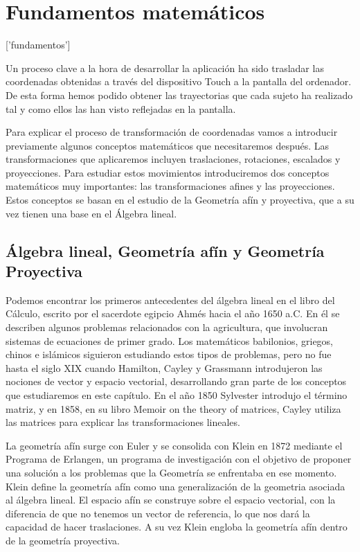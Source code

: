 \documentclass[a4paper,11pt, oneside]{book}
\begin{document}
\chapter{Fundamentos matemáticos}['fundamentos']

Un proceso clave a la hora de desarrollar la aplicación ha sido trasladar las coordenadas obtenidas a través del dispositivo Touch a la pantalla del ordenador. De esta forma hemos podido obtener las trayectorias que cada sujeto ha realizado tal y como ellos las han visto reflejadas en la pantalla. 

Para explicar el proceso de transformación de coordenadas vamos a introducir previamente algunos conceptos matemáticos que necesitaremos después. Las transformaciones que aplicaremos incluyen traslaciones, rotaciones, escalados y proyecciones. Para estudiar estos movimientos introduciremos dos conceptos matemáticos muy importantes: las transformaciones afines y las proyecciones. Estos conceptos se basan en el estudio de la Geometría afín y proyectiva, que a su vez tienen una base en el Álgebra lineal. 


\section{Álgebra lineal, Geometría afín y Geometría Proyectiva}
Podemos encontrar los primeros antecedentes del álgebra lineal en el libro del Cálculo, escrito por el sacerdote egipcio Ahmés hacia el año 1650 a.C. En él se describen algunos problemas relacionados con la agricultura, que involucran sistemas de ecuaciones de primer grado. Los matemáticos babilonios, griegos, chinos e islámicos siguieron estudiando estos tipos de problemas, pero no fue hasta el siglo  XIX cuando Hamilton, Cayley y Grassmann introdujeron las nociones de vector y espacio vectorial, desarrollando gran parte de los conceptos que estudiaremos en este capítulo. En el año 1850 Sylvester introdujo el término matriz, y en 1858, en su libro Memoir on the theory of matrices, Cayley utiliza las matrices para explicar las transformaciones lineales.

La geometría afín surge con Euler y se consolida con Klein en 1872 mediante el Programa de Erlangen, un programa de investigación con el objetivo de proponer una solución a los problemas que la Geometría se enfrentaba en ese momento. Klein define la geometría afín como una generalización de la geometria asociada al álgebra lineal. El espacio afín se construye sobre el espacio vectorial, con la diferencia de que no tenemos un vector de referencia, lo que nos dará la capacidad de hacer traslaciones. A su vez Klein engloba la geometría afín dentro de la geometría proyectiva.
\end{document}
